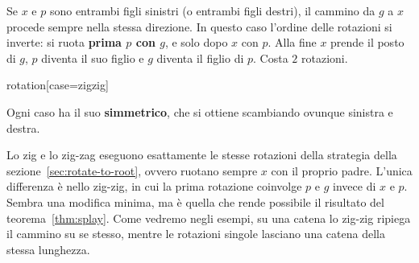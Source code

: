 \begin{casofig}
Se $x$ e $p$ sono entrambi figli sinistri (o entrambi figli destri), il cammino da $g$ a $x$ procede sempre nella stessa direzione. In questo caso l'ordine delle rotazioni si inverte: si ruota \textbf{prima $p$ con $g$}, e solo dopo $x$ con $p$. Alla fine $x$ prende il posto di $g$, $p$ diventa il suo figlio e $g$ diventa il figlio di $p$. Costa $2$ rotazioni.
\tcblower
\begin{widget}{rotation}[case=zigzig]
\end{widget}
\end{casofig}

Ogni caso ha il suo \textbf{simmetrico}, che si ottiene scambiando ovunque sinistra e destra.

\begin{osservazione}
Lo zig e lo zig-zag eseguono esattamente le stesse rotazioni della strategia della sezione~\ref{sec:rotate-to-root}, ovvero ruotano sempre $x$ con il proprio padre. L'unica differenza è nello zig-zig, in cui la prima rotazione coinvolge $p$ e $g$ invece di $x$ e $p$. Sembra una modifica minima, ma è quella che rende possibile il risultato del teorema~\ref{thm:splay}. Come vedremo negli esempi, su una catena lo zig-zig ripiega il cammino su se stesso, mentre le rotazioni singole lasciano una catena della stessa lunghezza.
\end{osservazione}

